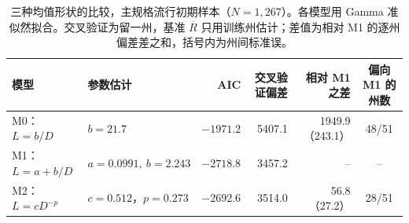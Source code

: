 \begin{table}[!tbp]
  \centering
  \caption{三种均值形状的比较，主规格流行初期样本（$N=1{,}267$）。各模型用 Gamma 准似然拟合。交叉验证为留一州，基准 $\overline{R}$ 只用训练州估计；差值为相对 M1 的逐州偏差差之和，括号内为州间标准误。}
  \label{tab:shape}
  \small
  \begin{tabular}{@{}llrrrc@{}}
    \toprule
    模型 & 参数估计 & AIC & 交叉验证偏差 & 相对 M1 之差 & 偏向 M1 的州数 \\
    \midrule
    M0：$L=b/D$ & $b=21.7$ & $-1971.2$ & 5407.1 & 1949.9（243.1） & 48/51 \\
    M1：$L=a+b/D$ & $a=0.0991,\ b=2.243$ & $-2718.8$ & 3457.2 & -- & -- \\
    M2：$L=cD^{-p}$ & $c=0.512$，$p=0.273$ & $-2692.6$ & 3514.0 & 56.8（27.2） & 28/51 \\
    \bottomrule
  \end{tabular}
\end{table}
